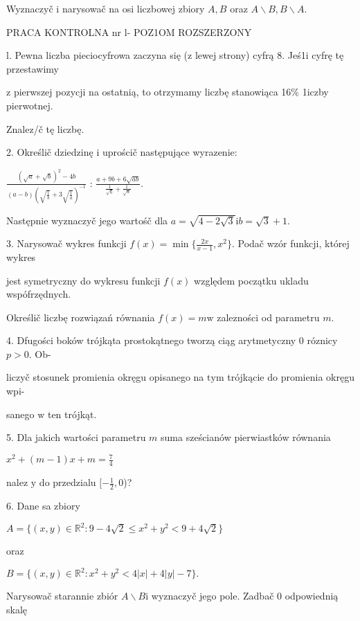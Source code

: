 \documentclass[a4paper,12pt]{article}
\begin{document}
Wyznaczyč $\mathrm{i}$ narysowač na osi liczbowej zbiory $A, B$ oraz $A\backslash B, B\backslash A.$




PRACA KONTROLNA nr l- POZ1OM ROZSZERZONY

l. Pewna liczba pieciocyfrowa zaczyna się ($\mathrm{z}$ lewej strony) cyfrą 8. Jeś1i cyfrę tę przestawimy

$\mathrm{z}$ pierwszej pozycji na ostatnią, to otrzymamy liczbę stanowiąca 16\% 1iczby pierwotnej.

Znalez/č tę liczbę.

2. Określič dziedzinę $\mathrm{i}$ uprościč następujące wyrazenie:

$\displaystyle \frac{(\sqrt{a}+\sqrt{b})^{2}-4b}{(a-b)(\sqrt{\frac{1}{b}}+3\sqrt{\frac{1}{a}})^{-1}}$ : $\displaystyle \frac{a+9b+6\sqrt{ab}}{\frac{1}{\sqrt{b}}+\frac{1}{\sqrt{a}}}.$

Następnie wyznaczyč jego wartośč dla $a=\sqrt{4-2\sqrt{3}} \mathrm{i} b=\sqrt{3}+1.$

3. Narysowač wykres funkcji $f(x) = \displaystyle \min\{\frac{2x}{x-1},x^{2}\}$. Podač wzór funkcji, której wykres

jest symetryczny do wykresu funkcji $f(x)$ względem początku ukladu wspófrzędnych.

Określič liczbę rozwiązań równania $f(x)=m\mathrm{w}$ zalezności od parametru $m.$

4. Dfugości boków trójkąta prostokątnego tworzą ciąg arytmetyczny $0$ róznicy $p>0$. Ob-

liczyč stosunek promienia okręgu opisanego na $\mathrm{t}\mathrm{y}\mathrm{m}$ trójkącie do promienia okręgu wpi-

sanego $\mathrm{w}$ ten trójkąt.

5. Dla jakich wartości parametru $m$ suma sześcianów pierwiastków równania

$x^{2}+(m-1)x+m=\displaystyle \frac{7}{4}$

nalez $\mathrm{y}$ do przedzialu $[-\displaystyle \frac{1}{2},0$)?

6. Dane sa zbiory

$A=\{(x,y)\in \mathbb{R}^{2}:9-4\sqrt{2}\leq x^{2}+y^{2}<9+4\sqrt{2}\}$

oraz

$B=\{(x,y)\in \mathbb{R}^{2}:x^{2}+y^{2}<4|x|+4|y|-7\}.$

Narysowač starannie zbiór $A\backslash B \mathrm{i}$ wyznaczyč jego pole. Zadbač $0$ odpowiednią skalę
\end{document}
